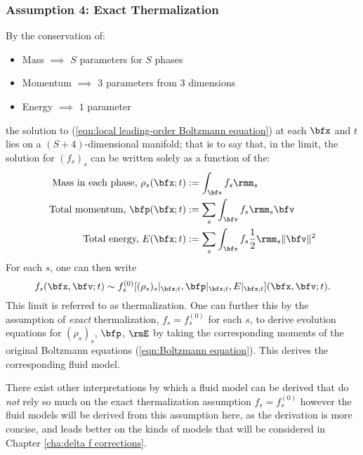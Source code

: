 \subsubsection*{Assumption 4: Exact Thermalization}
    By the conservation of:
    \begin{itemize}
        \item  Mass $\implies$ $S$ parameters for $S$ phases
        \item  Momentum $\implies$ $3$ parameters from $3$ dimensions
        \item  Energy $\implies$ $1$ parameter
    \end{itemize}
    the solution to (\ref{eqn:local leading-order Boltzmann equation}) at each $\bfx$ and $t$ lies on a $(S + 4)$-dimensional manifold; that is to say that, in the limit, the solution for $(f_{s})_{s}$ can be written solely as a function of the:
    \begin{align}
        \text{Mass in each phase, }  \rho_{s}(\bfx; t)  &:=  \int_{\bfv}f_{s}\rmm_{s}  \\
        \text{Total momentum, }          \bfp(\bfx; t)  &:=  \sum_{s}\int_{\bfv}f_{s}\rmm_{s}\bfv  \\
        \text{Total energy, }               E(\bfx; t)  &:=  \sum_{s}\int_{\bfv}f_{s}\frac{1}{2}\rmm_{s}\|\bfv\|^{2}
    \end{align}
    For each $s$, one can then write
    \begin{equation}
        f_{s}(\bfx, \bfv; t)  \sim  f_{s}^{(0)}[(\rho_{s})_{s}|_{\bfx; t}, \bfp|_{\bfx; t}, E|_{\bfx; t}](\bfx, \bfv; t).
    \end{equation}
    This limit is referred to as thermalization. One can further this by the assumption of \emph{exact} thermalization, $f_{s}  =  f_{s}^{(0)}$ for each $s$, to derive evolution equations for $(\rho_{s})_{s}$, $\bfp$, $\rmE$ by taking the corresponding moments of the original Boltzmann equations (\ref{eqn:Boltzmann equation}). This derives the corresponding fluid model.

    \begin{remark}
        There exist other interpretations by which a fluid model can be derived that do \emph{not} rely so much on the exact thermalization assumption $f_{s}  =  f_{s}^{(0)}$  however the fluid models will be derived from this assumption here, as the derivation is more concise, and leads better on the kinds of models that will be considered in Chapter \ref{cha:delta f corrections}. 
    \end{remark}

